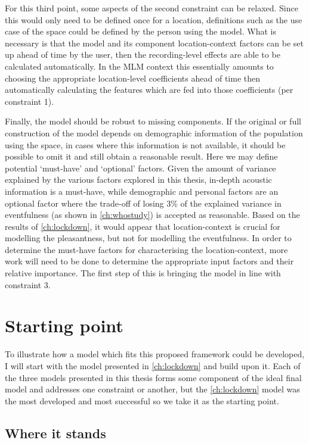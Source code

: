 For this third point, some aspects of the second constraint can be relaxed. Since this would only need to be defined once for a location, definitions such as the use case of the space could be defined by the person using the model. What is necessary is that the model and its component location-context factors can be set up ahead of time by the user, then the recording-level effects are able to be calculated automatically. In the MLM context this essentially amounts to choosing the appropriate location-level coefficients ahead of time then automatically calculating the features which are fed into those coefficients (per constraint 1).

Finally, the model should be robust to missing components. If the original or full construction of the model depends on demographic information of the population using the space, in cases where this information is not available, it should be possible to omit it and still obtain a reasonable result. Here we may define potential `must-have’ and `optional’ factors. Given the amount of variance explained by the various factors explored in this thesis, in-depth acoustic information is a must-have, while demographic and personal factors are an optional factor where the trade-off of losing 3\% of the explained variance in eventfulness (as shown in \cref{ch:whostudy}) is accepted as reasonable. Based on the results of \cref{ch:lockdown}, it would appear that location-context is crucial for modelling the pleasantness, but not for modelling the eventfulness. In order to determine the must-have factors for characterising the location-context, more work will need to be done to determine the appropriate input factors and their relative importance. The first step of this is bringing the model in line with constraint 3. 


\section{Starting point}

To illustrate how a model which fits this proposed framework could be developed, I will start with the model presented in \cref{ch:lockdown} and build upon it. Each of the three models presented in this thesis forms some component of the ideal final model and addresses one constraint or another, but the \cref{ch:lockdown} model was the most developed and most successful so we take it as the starting point. 

\subsection{Where it stands}

